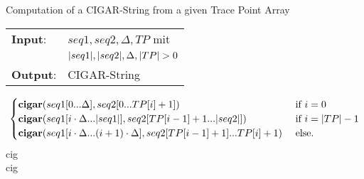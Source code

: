 \begin{algorithm}
\caption{Computation of a CIGAR-String from a given Trace Point Array}
\label{decode}
\noindent\begin{tabular}{@{}l@{~}l}
	\textbf{Input}:
	&$seq1, seq2, \Delta, TP$ mit\\
	&$|seq1|, |seq2|, \Delta, |TP| > 0$\\
	\textbf{Output}:&CIGAR-String
\end{tabular}
\medskip
	\begin{algorithmic}[1]
		\State {}
		\State{}\[{\begin{cases}
			\textbf{cigar}(seq1[0...\Delta], seq2[0...TP[i] + 1])&\text{ if } i = 0\\
			\textbf{cigar}(seq1[i \cdot \Delta...|seq1|], seq2[TP[i - 1] + 1...|seq2|])&\text{ if } i = |TP| - 1\\
			\textbf{cigar}(seq1[i \cdot \Delta...(i + 1) \cdot \Delta], seq2[TP[i - 1] + 1]...TP[i] + 1)&\text{ else.}
		\end{cases}}\]
		\EndFor
		\State {}
		\State \Return cig
		\EndFunction\\
		
		\State {}
		\State {}
			\State {}
				\State {}
				\EndIf
			\EndIf
				\State {}
			\EndIf
		\EndFor
		\State \Return cig
		\EndFunction
	\end{algorithmic}
\end{algorithm}
